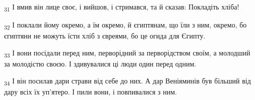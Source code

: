 \begin{tcolorbox}
\textsubscript{31} І вмив він лице своє, і вийшов, і стримався, та й сказав: Покладіть хліба!
\end{tcolorbox}
\begin{tcolorbox}
\textsubscript{32} І поклали йому окремо, а їм окремо, й єгиптянам, що їли з ним, окремо, бо єгиптяни не можуть їсти хліб з євреями, бо це огида для Єгипту.
\end{tcolorbox}
\begin{tcolorbox}
\textsubscript{33} І вони посідали перед ним, перворідний за перворідством своїм, а молодший за молодістю своєю. І здивувалися ці люди один перед одним.
\end{tcolorbox}
\begin{tcolorbox}
\textsubscript{34} І він посилав дари страви від себе до них. А дар Веніяминів був більший від дару всіх їх уп'ятеро. І пили вони, і повпивалися з ним.
\end{tcolorbox}

